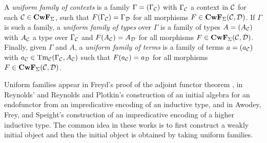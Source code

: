\documentclass{lmcs}
\def\D{\mathcal{D}}
\def\Cwf{\mathbf{CwF}}
\begin{document}
A {\em uniform family of contexts} is a family $\Gamma = (\Gamma_{{\mathcal C}})$ with $\Gamma_{\mathcal C}$ a context in
${\mathcal C}$ for each $\C \in \Cwf_{\Sigma}$, such that
$F(\Gamma_\C) = \Gamma_\D$ for all morphisms $F \in \Cwf_{\Sigma}(\C,\D)$.
If $\Gamma$ is such a family, a {\em uniform family of types} over $\Gamma$ is a
family of types $A = (A_{{\mathcal C}})$ with $A_{{\mathcal C}}$ a type over $\Gamma_{{\mathcal C}}$ and
$F(A_{\C}) = A_{\D}$ for all morphisms $F \in \Cwf_{\Sigma}(\C,\D)$.
Finally, given $\Gamma$ and $A$, a {\em uniform family of terms} is a family
of terms $a = (a_{{\mathcal C}})$ with $a_{\mathcal C} \in \mathrm{Tm}_{{\mathcal C}}(\Gamma_{{\mathcal C}},A_{{\mathcal C}})$ such that
$F(a_{\C}) = a_{\D}$ for all morphisms $F \in \Cwf_{\Sigma}(\C,\D)$.

\begin{remark}
Uniform families appear in Freyd's proof of the adjoint functor theorem \cite{freyd:abelian}, in Reynolds' \cite{reynolds:impredicative} and Reynolds and Plotkin's construction \cite{plotkin-reynolds} of an initial algebra for an endofunctor from an impredicative encoding of an inductive type, and in Awodey, Frey, and Speight's  \cite{awodey:impredicative} construction of an impredicative encoding of a higher inductive type. The common idea in these works is to first construct a weakly initial object and then the initial object is obtained by taking uniform families.
\end{remark}
\end{document}
